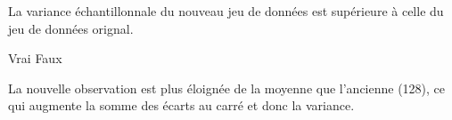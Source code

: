 \begin{questions}
\begin{parts}
\begin{subparts}
\subpart[3] La variance échantillonnale du nouveau jeu de données est supérieure à celle du jeu de données orignal.


    \begin{oneparcheckboxes}
        \correctchoice Vrai
        \choice Faux
    \end{oneparcheckboxes}
\begin{solution}
La nouvelle observation est plus éloignée de la moyenne que l'ancienne (128), ce qui augmente la somme des écarts au carré et donc la variance.
\end{solution}

\end{subparts}
\end{parts}

\end{questions}
 
